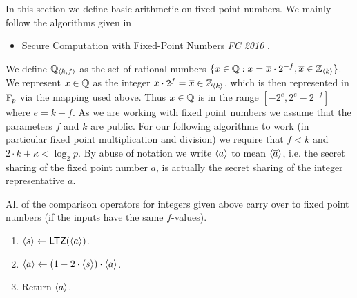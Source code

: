   In this section we define basic arithmetic on fixed
  point numbers.
  We mainly follow the algorithms given in
  \begin{itemize}
    \item Secure Computation with Fixed-Point Numbers {\em FC 2010} \cite{CS10}.
  \end{itemize}
  We define ${\mathbb{Q}}_{\langle k, f \rangle}$ as the set of rational numbers
$\{x \in {\mathbb{Q}}: x = \overline{x} \cdot 2^{-f}, \overline{x} \in {\mathbb{Z}}_{\langle k \rangle}\}$.
  We represent $x \in {\mathbb{Q}}$ as the integer $x \cdot 2^f = \overline{x} \in {\mathbb{Z}}_{\langle k \rangle}$,
  which is then represented in ${\mathbb{F}}_p$ via the mapping used above.
  Thus $x \in {\mathbb{Q}}$ is in the range $[-2^e,2^e-2^{-f}]$
  where $e=k-f$.
  As we are working with fixed point numbers we assume that the
  parameters $f$ and $k$ are public.
  For our following algorithms to work (in particular fixed point
  multiplication and division) we require that
$f<k$ and $2 \cdot k + \kappa < \log_2 p$.
  By abuse of notation we write $\langle a \rangle$ to mean $\langle \overline{a} \rangle$,
  i.e. the secret sharing of the fixed point number $a$,
  is actually the secret sharing of the integer representative
$\overline{a}$.

  \iffalse
    \msubsubsection{$\mathsf{Scale}(\sshare{a},k,f_1,f_2)$:}
    Sometimes we want to scale the input fixed point number $a$
    from $\Qk{f_1}$ to $\Qk{f_2}$.
    \begin{enumerate}
      \item $m \asn f_2-f_1$.
      \item If $m\ge 0$ then $\sshare{a'} \asn 2^m \cdot \sshare{a}$.
      \item Else $\sshare{a'} \asn \mathsf{TruncPr}(\sshare{a},k,-m)$.
      \item Return $\sshare{a'}$.
    \end{enumerate}
    This is not directly callable from MAMBA it is here purely
    for documentation reasons.
  \fi

  All of the comparison operators for integers given above carry
  over to fixed point numbers (if the inputs have the same $f$-values).

  \begin{enumerate}
    \item $\langle s \rangle \leftarrow \mathsf{LTZ}(\langle a \rangle)$.
    \item $\langle a \rangle \leftarrow (1-2\cdot \langle s \rangle) \cdot \langle a \rangle$.
    \item Return $\langle a \rangle$.
  \end{enumerate}

